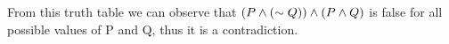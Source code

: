 \documentclass[12pt]{article}
\makeatletter
\newcommand*{\arabicodd}[1]{%
  \expandafter\@arabicodd\csname c@#1\endcsname
}
\newcommand*{\@arabicodd}[1]{%
  \@arabic{\numexpr(#1)*2-1\relax}%
}
\makeatother
\begin{document}
\begin{enumerate}[label=2.\arabicodd*, start=24]
\begin{minipage}{\linewidth}
\begin{sidewaystable}
\begin{tabular}{@{}llllllll@{}}
            \end{tabular}
          \end{sidewaystable}
        \end{minipage}
        \linebreak
        \linebreak
        From this truth table we can observe that $\qty(P \land \qty(\sim Q)) \land \qty(P \land Q)$ is
        false for all possible values of P and Q, thus it is a contradiction.
\end{enumerate}
\end{document}
